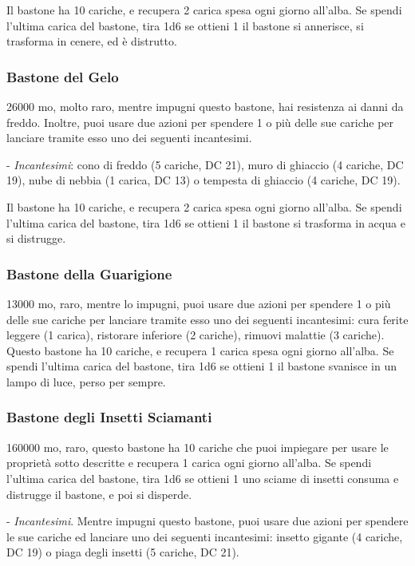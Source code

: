 \begin{multicols}{2}
Il bastone ha 10 cariche, e recupera 2 carica spesa ogni giorno all'alba. Se spendi l'ultima carica del bastone, tira 1d6 se ottieni 1 il bastone si annerisce, si trasforma in cenere, ed è distrutto.

\subsubsection*{Bastone del Gelo}
26000 mo, molto raro, mentre impugni questo bastone, hai resistenza ai danni da freddo.
Inoltre, puoi usare due azioni per spendere 1 o più delle sue cariche per lanciare tramite esso uno dei seguenti incantesimi.

- \textit{Incantesimi}: cono di freddo (5 cariche, DC 21), muro di ghiaccio (4 cariche, DC 19), nube di nebbia (1 carica, DC 13) o tempesta di ghiaccio (4 cariche, DC 19).

Il bastone ha 10 cariche, e recupera 2 carica spesa ogni giorno all'alba. Se spendi l'ultima carica del bastone, tira 1d6 se ottieni 1 il bastone si trasforma in acqua e si distrugge.

\subsubsection*{Bastone della Guarigione}
13000 mo, raro, mentre lo impugni, puoi usare due azioni per spendere 1 o più delle sue cariche per lanciare tramite esso uno dei seguenti incantesimi: cura ferite leggere (1 carica), ristorare inferiore (2 cariche), rimuovi malattie (3 cariche). Questo bastone ha 10 cariche, e recupera 1 carica spesa ogni giorno all'alba. Se spendi l'ultima carica del bastone, tira 1d6 se ottieni 1 il bastone svanisce in un lampo di luce, perso per sempre.

\subsubsection*{Bastone degli Insetti Sciamanti}
160000 mo, raro, questo bastone ha 10 cariche che puoi impiegare per usare le proprietà sotto descritte e recupera 1 carica ogni giorno all'alba. Se spendi l'ultima carica del bastone, tira 1d6 se ottieni 1 uno sciame di insetti consuma e distrugge il bastone, e poi si disperde.

- \textit{Incantesimi}. Mentre impugni questo bastone, puoi usare due azioni per spendere le sue cariche ed lanciare uno dei seguenti incantesimi: insetto gigante (4 cariche, DC 19) o piaga degli insetti (5 cariche, DC 21).


\end{multicols}
